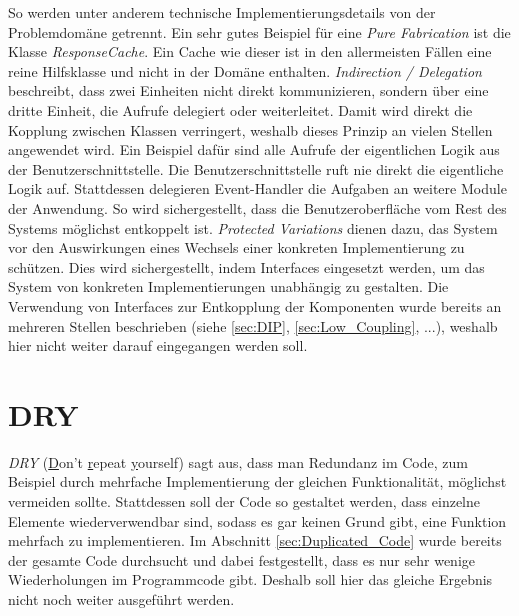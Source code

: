 So werden unter anderem technische Implementierungsdetails von der Problemdomäne getrennt.
Ein sehr gutes Beispiel für eine \textit{Pure Fabrication} ist die Klasse \textit{ResponseCache}. 
Ein Cache wie dieser ist in den allermeisten Fällen eine reine Hilfsklasse und nicht in der Domäne enthalten.
\newline
\newline
\textit{Indirection / Delegation} beschreibt, dass zwei Einheiten nicht direkt kommunizieren, sondern über eine dritte Einheit, die Aufrufe delegiert oder weiterleitet.
Damit wird direkt die Kopplung zwischen Klassen verringert, weshalb dieses Prinzip an vielen Stellen angewendet wird.
Ein Beispiel dafür sind alle Aufrufe der eigentlichen Logik aus der Benutzerschnittstelle.
Die Benutzerschnittstelle ruft nie direkt die eigentliche Logik auf.
Stattdessen delegieren Event-Handler die Aufgaben an weitere Module der Anwendung.
So wird sichergestellt, dass die Benutzeroberfläche vom Rest des Systems möglichst entkoppelt ist.
\newline
\newline
\textit{Protected Variations} dienen dazu, das System vor den Auswirkungen eines Wechsels einer konkreten Implementierung zu schützen.
Dies wird sichergestellt, indem Interfaces eingesetzt werden, um das System von konkreten Implementierungen unabhängig zu gestalten.
Die Verwendung von Interfaces zur Entkopplung der Komponenten wurde bereits an mehreren Stellen beschrieben (siehe \ref{sec:DIP}, \ref{sec:Low_Coupling}, ...), weshalb hier nicht weiter darauf eingegangen werden soll.

\section{DRY}
\textit{DRY} (\underline{D}on't \underline{r}epeat \underline{y}ourself) sagt aus, dass man Redundanz im Code, zum Beispiel durch mehrfache Implementierung der gleichen Funktionalität, möglichst vermeiden sollte.
Stattdessen soll der Code so gestaltet werden, dass einzelne Elemente wiederverwendbar sind, sodass es gar keinen Grund gibt, eine Funktion mehrfach zu implementieren.
Im Abschnitt \ref{sec:Duplicated_Code} wurde bereits der gesamte Code durchsucht und dabei festgestellt, dass es nur sehr wenige Wiederholungen im Programmcode gibt.
Deshalb soll hier das gleiche Ergebnis nicht noch weiter ausgeführt werden.